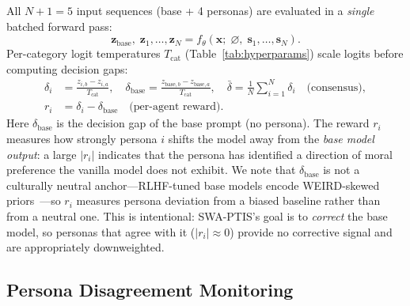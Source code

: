 \documentclass{article}
\begin{document}
All $N+1=5$ input sequences (base + 4 personas) are evaluated in a \emph{single}
batched forward pass:
\begin{equation}
  \mathbf{z}_{\text{base}},\; \mathbf{z}_1, \ldots, \mathbf{z}_N
  = f_\theta\!\left(\mathbf{x};\; \varnothing,\; \mathbf{s}_1, \ldots, \mathbf{s}_N\right).
  \label{eq:batch}
\end{equation}
Per-category logit temperatures $T_{\text{cat}}$ (Table~\ref{tab:hyperparams}) scale
logits before computing decision gaps:
\begin{align}
  \delta_i &= \frac{z_{i,b} - z_{i,a}}{T_{\text{cat}}}, \quad
  \delta_{\text{base}} = \frac{z_{\text{base},b} - z_{\text{base},a}}{T_{\text{cat}}}, \quad
  \bar{\delta} = \frac{1}{N}\sum_{i=1}^{N} \delta_i \quad \text{(consensus)},
  \label{eq:consensus} \\
  r_i &= \delta_i - \delta_{\text{base}} \quad \text{(per-agent reward)}.
  \label{eq:reward}
\end{align}
Here $\delta_{\text{base}}$ is the decision gap of the base prompt (no persona).
The reward $r_i$ measures how strongly persona $i$ shifts the model away from
the \emph{base model output}: a large $|r_i|$ indicates that the persona has
identified a direction of moral preference the vanilla model does not exhibit.
We note that $\delta_{\text{base}}$ is not a culturally neutral anchor---RLHF-tuned
base models encode WEIRD-skewed priors~\citep{santurkar2023opinions}---so $r_i$
measures persona deviation from a biased baseline rather than from a neutral
one. This is intentional: SWA-PTIS's goal is to \emph{correct} the base model,
so personas that agree with it ($|r_i| \approx 0$) provide no corrective signal
and are appropriately downweighted.

\subsection{Persona Disagreement Monitoring}
\label{sec:method:tau}
\end{document}
